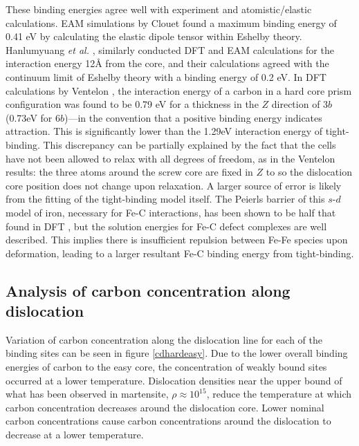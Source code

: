 \documentclass[a4paper,11pt]{article}
\begin{document}
These binding energies agree well with experiment and atomistic/elastic calculations. EAM simulations
by Clouet \cite{Clouet2008,Becquart2007} found a maximum binding energy of 0.41 eV by calculating
the elastic dipole tensor within Eshelby theory. Hanlumyuang \emph{et al.} \cite{Hanlumyuang2010},
similarly conducted DFT and EAM calculations for the interaction energy 12\AA{} from the core, and
their calculations agreed with the continuum limit of Eshelby theory with a binding energy of
0.2 eV. In DFT calculations by Ventelon \cite{Ventelon2015}, the interaction energy of a carbon in a
hard core prism configuration was found to be 0.79 eV for a thickness in the \(Z\) direction of
3\(b\) (0.73eV for \(6b\))---in the convention that a positive binding energy indicates
attraction. This is significantly lower than the 1.29eV interaction energy of tight-binding.
This discrepancy can be partially explained by the fact that the cells have not been allowed to
relax with all degrees of freedom, as in the Ventelon results: the three atoms around the screw
core are fixed in \(Z\) to so the dislocation core position does not change upon relaxation. A
larger source of error is likely from the fitting of the tight-binding model itself. The
Peierls barrier of this \(s\text{-}d\) model of iron, necessary for Fe-C interactions, has been shown to be
half that found in DFT \cite{Simpson2019}, but the solution energies for
Fe-C defect complexes are well described. This implies there is insufficient repulsion between
Fe-Fe species upon deformation, leading to a larger resultant Fe-C binding energy from tight-binding.




\subsection{Analysis of carbon concentration along dislocation}
\label{sec:orgfca6f75}

Variation of carbon concentration along the dislocation line for each of the binding sites can be
seen in figure \ref{cdhardeasy}. Due to the lower overall binding energies of carbon to the easy
core, the concentration of weakly bound sites occurred at a lower temperature. Dislocation
densities near the upper bound of what has been observed in martensite, \(\rho \approx10^{15}\), reduce
the temperature at which carbon concentration decreases around the dislocation core. Lower
nominal carbon concentrations cause carbon concentrations around the dislocation to decrease at a
lower temperature.
\end{document}
